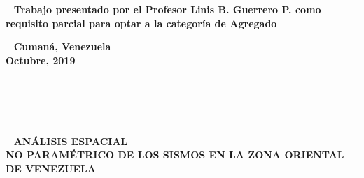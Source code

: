 \documentclass[12pt]{report}
\begin{document}
      




\begin{center}
	{\ {\bf \vspace{0.2cm}  Trabajo presentado por el Profesor Linis B. Guerrero P. como requisito
			\vspace{0.2cm} 	parcial para optar a la categoría de Agregado
	}}
\end{center}






\begin{center}
	{\ {\bf \vspace{0.2cm}  	Cumaná, Venezuela \\
			Octubre, 2019 \\
			\vspace{0.2cm} 
	}}
\end{center}







\thispagestyle{empty}~~\vspace{-0.2cm}
	
	
		
	
	
		
		  
		\hspace{2cm}
		
		\vskip 5cm \rule{\linewidth}{1.3pt}\\[0.5cm]
		\begin{center}
			{\ \LARGE{\bf \vspace{0.2cm} ANÁLISIS ESPACIAL\\ NO PARAMÉTRICO 
					\vspace{0.2cm} 	DE LOS SISMOS EN LA ZONA ORIENTAL DE VENEZUELA\\
			}}
		\end{center}
		
\end{document}
